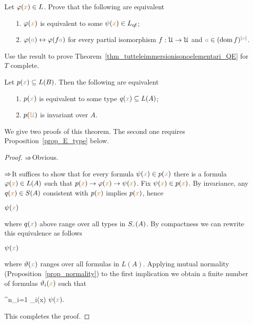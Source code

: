 \documentclass[creche.tex]{subfiles}
\begin{document}
\begin{exercise}\label{ex_qe_in_U}
Let $\varphi({\color{brown} x})\in L$. Prove that the following are equivalent
\begin{itemize}
 \item[1.] $\varphi({\color{brown} x})$ is equivalent to some $\psi({\color{brown} x})\in L_{\rm qf}$;
 \item[2.] $\varphi({\color{brown} a})\leftrightarrow \varphi(f{\color{brown} a})$ for every partial isomorphism $f:\EuScript U\to\EuScript U$ and ${\color{brown} a}\in(\mathop{\rm dom} f)^{|{\color{brown} x}|}$.
\end{itemize}
Use the result to prove Theorem~\ref{thm_tutteleimmersionisonoelementari_QE} for $T$ complete.\QED
\end{exercise}

\begin{proposition}\label{prop_inv_types}
Let $p({\color{brown} x})\subseteq L(B)$.
Then the following are equivalent
\begin{itemize}
 \item[1.] $p({\color{brown} x})$ is equivalent to some type $q({\color{brown} x})\subseteq L(A)$;
 \item[2.] $p({\color{brown}\EuScript U})$ is invariant over $A$.
\end{itemize}
\end{proposition}

We give two proofs of this theorem.  The second one requires Proposition~\ref{prop_E_type} below.

\begin{proof}
$\Rightarrow$\quad Obvious. 

$\Rightarrow$\quad It suffices to show that for every formula $\psi({\color{brown} x})\in p({\color{brown} x})$ there is a formula $\varphi({\color{brown} x})\in L(A)$ such that $p({\color{brown} x})\rightarrow\varphi({\color{brown} x})\rightarrow\psi({\color{brown} x})$. Fix $\psi({\color{brown} x})\in p({\color{brown} x})$. By invariance, any $q({\color{brown} x})\in S(A)$ consistent with $p({\color{brown} x})$ implies $p({\color{brown} x})$, hence

\medrel{\imp}$\psi({\color{brown} x})$

where $q({\color{brown} x})$ above range over all types in $S_{\color{brown} x}(A)$. By compactness we can rewrite this equivalence as follows

\medrel{\imp}$\psi({\color{brown} x})$

where $\vartheta({\color{brown} x})$ ranges over all formulas in $L(A)$. Applying mutual normality (Proposition~\ref{prop_normality}) to the first implication we obtain a finite number of formulas $\vartheta_i({\color{brown} x})$ such that 

{\imp}
{\bigvee^n_{i=1} \theta_i({\mr x})}
\medrel{\imp}
$\psi({\color{brown} x}).$

This completes the proof.
\end{proof}
\end{document}
